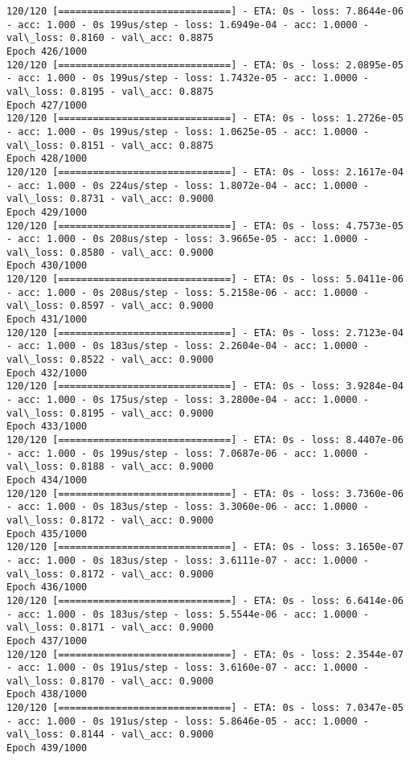 \documentclass[11pt]{article}
\begin{document}
\begin{Verbatim}[commandchars=\\\{\}]
120/120 [==============================] - ETA: 0s - loss: 7.8644e-06 - acc: 1.000 - 0s 199us/step - loss: 1.6949e-04 - acc: 1.0000 - val\_loss: 0.8160 - val\_acc: 0.8875
Epoch 426/1000
120/120 [==============================] - ETA: 0s - loss: 2.0895e-05 - acc: 1.000 - 0s 199us/step - loss: 1.7432e-05 - acc: 1.0000 - val\_loss: 0.8195 - val\_acc: 0.8875
Epoch 427/1000
120/120 [==============================] - ETA: 0s - loss: 1.2726e-05 - acc: 1.000 - 0s 199us/step - loss: 1.0625e-05 - acc: 1.0000 - val\_loss: 0.8151 - val\_acc: 0.8875
Epoch 428/1000
120/120 [==============================] - ETA: 0s - loss: 2.1617e-04 - acc: 1.000 - 0s 224us/step - loss: 1.8072e-04 - acc: 1.0000 - val\_loss: 0.8731 - val\_acc: 0.9000
Epoch 429/1000
120/120 [==============================] - ETA: 0s - loss: 4.7573e-05 - acc: 1.000 - 0s 208us/step - loss: 3.9665e-05 - acc: 1.0000 - val\_loss: 0.8580 - val\_acc: 0.9000
Epoch 430/1000
120/120 [==============================] - ETA: 0s - loss: 5.0411e-06 - acc: 1.000 - 0s 208us/step - loss: 5.2158e-06 - acc: 1.0000 - val\_loss: 0.8597 - val\_acc: 0.9000
Epoch 431/1000
120/120 [==============================] - ETA: 0s - loss: 2.7123e-04 - acc: 1.000 - 0s 183us/step - loss: 2.2604e-04 - acc: 1.0000 - val\_loss: 0.8522 - val\_acc: 0.9000
Epoch 432/1000
120/120 [==============================] - ETA: 0s - loss: 3.9284e-04 - acc: 1.000 - 0s 175us/step - loss: 3.2800e-04 - acc: 1.0000 - val\_loss: 0.8195 - val\_acc: 0.9000
Epoch 433/1000
120/120 [==============================] - ETA: 0s - loss: 8.4407e-06 - acc: 1.000 - 0s 199us/step - loss: 7.0687e-06 - acc: 1.0000 - val\_loss: 0.8188 - val\_acc: 0.9000
Epoch 434/1000
120/120 [==============================] - ETA: 0s - loss: 3.7360e-06 - acc: 1.000 - 0s 183us/step - loss: 3.3060e-06 - acc: 1.0000 - val\_loss: 0.8172 - val\_acc: 0.9000
Epoch 435/1000
120/120 [==============================] - ETA: 0s - loss: 3.1650e-07 - acc: 1.000 - 0s 183us/step - loss: 3.6111e-07 - acc: 1.0000 - val\_loss: 0.8172 - val\_acc: 0.9000
Epoch 436/1000
120/120 [==============================] - ETA: 0s - loss: 6.6414e-06 - acc: 1.000 - 0s 183us/step - loss: 5.5544e-06 - acc: 1.0000 - val\_loss: 0.8171 - val\_acc: 0.9000
Epoch 437/1000
120/120 [==============================] - ETA: 0s - loss: 2.3544e-07 - acc: 1.000 - 0s 191us/step - loss: 3.6160e-07 - acc: 1.0000 - val\_loss: 0.8170 - val\_acc: 0.9000
Epoch 438/1000
120/120 [==============================] - ETA: 0s - loss: 7.0347e-05 - acc: 1.000 - 0s 191us/step - loss: 5.8646e-05 - acc: 1.0000 - val\_loss: 0.8144 - val\_acc: 0.9000
Epoch 439/1000

\end{Verbatim}
\end{document}
